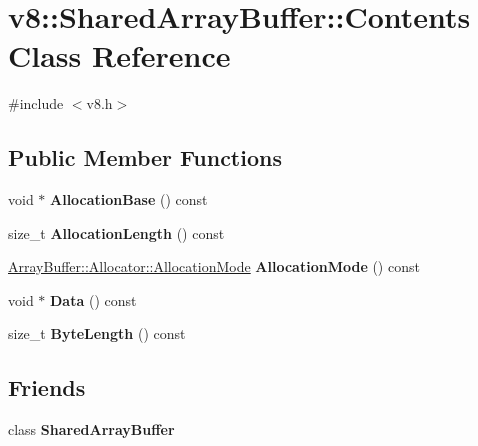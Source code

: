 \hypertarget{classv8_1_1SharedArrayBuffer_1_1Contents}{}\section{v8\+:\+:Shared\+Array\+Buffer\+:\+:Contents Class Reference}
\label{classv8_1_1SharedArrayBuffer_1_1Contents}


{\ttfamily \#include $<$v8.\+h$>$}

\subsection*{Public Member Functions}
\begin{DoxyCompactItemize}
\item 
\mbox{\label{classv8_1_1SharedArrayBuffer_1_1Contents_a0a17b70f92830caf87f23cd3dc276489}} 
void $\ast$ {\bfseries Allocation\+Base} () const
\item 
\mbox{\label{classv8_1_1SharedArrayBuffer_1_1Contents_a5d3facf7b33602f5bd8d6641c15a626a}} 
size\+\_\+t {\bfseries Allocation\+Length} () const
\item 
\mbox{\label{classv8_1_1SharedArrayBuffer_1_1Contents_ad878fba7975a9ee251fa935c246eb4ff}} 
\mbox{\hyperlink{classv8_1_1ArrayBuffer_1_1Allocator_ab106d1fbad7be9f6fd8b0f5c550ac59e}{Array\+Buffer\+::\+Allocator\+::\+Allocation\+Mode}} {\bfseries Allocation\+Mode} () const
\item 
\mbox{\label{classv8_1_1SharedArrayBuffer_1_1Contents_a8a795e7b725530f608c83528e5d4193b}} 
void $\ast$ {\bfseries Data} () const
\item 
\mbox{\label{classv8_1_1SharedArrayBuffer_1_1Contents_a3678ae4afdb9884a5beeab644966382b}} 
size\+\_\+t {\bfseries Byte\+Length} () const
\end{DoxyCompactItemize}
\subsection*{Friends}
\begin{DoxyCompactItemize}
\item 
\mbox{\label{classv8_1_1SharedArrayBuffer_1_1Contents_a35ac2a80dda42f728b7b1dfc4c3cc040}} 
class {\bfseries Shared\+Array\+Buffer}
\end{DoxyCompactItemize}


